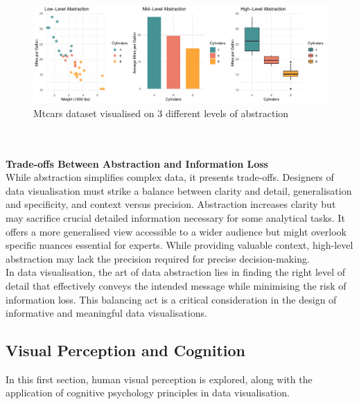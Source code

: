 \documentclass{article}\usepackage[]{graphicx}\usepackage[]{xcolor}
\makeatletter
\def\maxwidth{ %
  \ifdim\Gin@nat@width>\linewidth
    \linewidth
  \else
    \Gin@nat@width
  \fi
}
\newenvironment{knitrout}{}{} %
\numberwithin{equation}{section}
\makeatother
\begin{document}
\begin{knitrout}\scriptsize
{}\color{fgcolor}\begin{figure}[H]

{\centering \includegraphics[width=\maxwidth]{figure/beamer-abs-plots-1} 

}

\caption[Mtcars dataset visualised on 3 different levels of abstraction]{Mtcars dataset visualised on 3 different levels of abstraction}\label{fig:abs-plots}
\end{figure}

\end{knitrout}
\\
\\
\noindent \textbf{Trade-offs Between Abstraction and Information Loss}\\
While abstraction simplifies complex data, it presents trade-offs. Designers of data visualisation must strike a balance between clarity and detail, generalisation and specificity, and context versus precision. Abstraction increases clarity but may sacrifice crucial detailed information necessary for some analytical tasks. It offers a more generalised view accessible to a wider audience but might overlook specific nuances essential for experts. While providing valuable context, high-level abstraction may lack the precision required for precise decision-making.\\ 

\noindent 
In data visualisation, the art of data abstraction lies in finding the right level of detail that effectively conveys the intended message while minimising the risk of information loss. This balancing act is a critical consideration in the design of informative and meaningful data visualisations.

\subsection{Visual Perception and Cognition}
In this first section, human visual perception is explored, along with the application of cognitive psychology principles in data visualisation.\\ 
\end{document}
